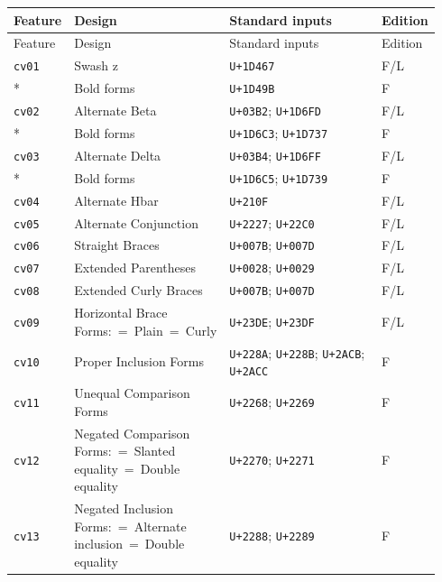 \documentclass[10pt]{article}
\renewcommand\arraystretch{1.1}
\begin{document}
\begingroup\setlength\tabcolsep{3pt}\renewcommand\arraystretch{1.12}
\begin{longtable}{@{}p{0.12\linewidth}>{\raggedright\arraybackslash}p{0.34\linewidth}p{0.39\linewidth}p{0.09\linewidth}@{}}
\toprule
Feature & Design & Standard inputs & Edition \\ \midrule \endfirsthead
\toprule
Feature & Design & Standard inputs & Edition \\ \midrule \endhead
\bottomrule\endfoot
\texttt{cv01} & Swash z & \texttt{U+1D467} & F/L \\*
 & Bold forms & \texttt{U+1D49B} & F \\
\texttt{cv02} & Alternate Beta & \texttt{U+03B2}; \texttt{U+1D6FD} & F/L \\*
 & Bold forms & \texttt{U+1D6C3}; \texttt{U+1D737} & F \\
\texttt{cv03} & Alternate Delta & \texttt{U+03B4}; \texttt{U+1D6FF} & F/L \\*
 & Bold forms & \texttt{U+1D6C5}; \texttt{U+1D739} & F \\
\texttt{cv04} & Alternate Hbar & \texttt{U+210F} & F/L \\
\texttt{cv05} & Alternate Conjunction & \texttt{U+2227}; \texttt{U+22C0}
& F/L \\
\texttt{cv06} & Straight Braces & \texttt{U+007B}; \texttt{U+007D} & F/L \\
\texttt{cv07} & Extended Parentheses & \texttt{U+0028}; \texttt{U+0029}
& F/L \\
\texttt{cv08} & Extended Curly Braces & \texttt{U+007B}; \texttt{U+007D}
& F/L \\
\texttt{cv09} & Horizontal Brace Forms:\newline 1~=~Plain\newline 2~=~Curly &
\texttt{U+23DE}; \texttt{U+23DF} & F/L \\
\texttt{cv10} & Proper Inclusion Forms & \texttt{U+228A}; \texttt{U+228B};
\texttt{U+2ACB}; \texttt{U+2ACC} & F \\
\texttt{cv11} & Unequal Comparison Forms & \texttt{U+2268}; \texttt{U+2269}
& F \\
\texttt{cv12} & Negated Comparison Forms:\newline 1~=~Slanted equality\newline
2~=~Double equality & \texttt{U+2270}; \texttt{U+2271} & F \\
\texttt{cv13} & Negated Inclusion Forms:\newline 1~=~Alternate
inclusion\newline 2~=~Double equality & \texttt{U+2288}; \texttt{U+2289} & F \\

\end{longtable}
\end{document}
